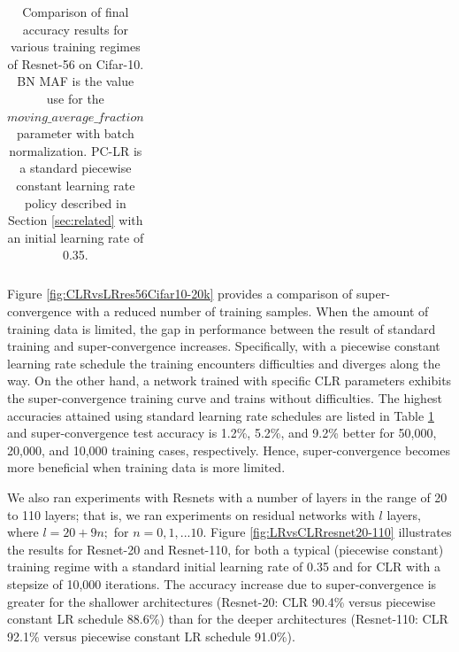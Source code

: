 \documentclass{article}
\begin{document}
\begin{table}[tb]
\begin{center}
\begin{tabular}{| c | c | c | c | c | }
		\end{tabular}
		\vspace{10pt}
		\caption{Comparison of final accuracy results for various training regimes of Resnet-56 on Cifar-10. BN MAF is the value use for the $moving\_average\_fraction$ parameter with batch normalization. PC-LR is a standard piecewise constant learning rate policy described in Section \ref{sec:related} with an initial learning rate of 0.35.}
		\label{tab1:results}
	\end{center}
	\vspace{-25pt}
\end{table}



Figure \ref{fig:CLRvsLRres56Cifar10-20k} provides a  comparison of super-convergence with a reduced number of training samples.
When the amount of training data is limited, the gap in performance between the result of standard training and super-convergence increases.
Specifically, with a  piecewise constant learning rate schedule  the training encounters difficulties and diverges along the way.
On the other hand, a network trained with specific CLR parameters exhibits the super-convergence training curve and trains without difficulties.
The highest accuracies attained using standard learning rate schedules are listed  in Table \ref{tab1:results} and super-convergence test accuracy is 1.2\%, 5.2\%, and 9.2\% better for 50,000, 20,000, and 10,000 training cases, respectively.  
Hence, super-convergence becomes more beneficial when  training data is more limited.

We also ran experiments with Resnets with a number of layers in the range of 20 to 110 layers; that is, we ran experiments on residual networks with $l$ layers, where $ l = 20 + 9 n;$ for $ n = 0, 1, ... 10$.
Figure \ref{fig:LRvsCLRresnet20-110} illustrates the results for Resnet-20 and Resnet-110, for both a typical (piecewise constant) training regime with a standard initial learning rate of 0.35 and for CLR with a stepsize of 10,000 iterations.
The accuracy increase due to super-convergence is greater for the shallower architectures (Resnet-20: CLR 90.4\% versus piecewise constant LR schedule 88.6\%) than for the deeper architectures (Resnet-110: CLR 92.1\% versus piecewise constant LR schedule 91.0\%).
\end{document}
